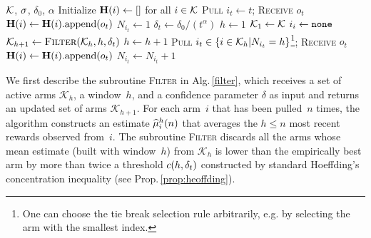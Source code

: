  \begin{minipage}{\textwidth}
\renewcommand*\footnoterule{}
\begin{savenotes}
\begin{algorithm}[H]
\caption{\myAlgorithm}
\label{alg:FEWA}
\begin{algorithmic}[1]
\Require $\mathcal{K}$,  $\sigma$, $\delta_0$, $\alpha$
\State Initialize $\mathbf{H}(i) \leftarrow []$ for all $i \in \mathcal{K}$
	\State \textsc{Pull}  $i_t \gets t$; \textsc{Receive} $o_{t}$
	\State $\mathbf{H}(i) \gets \mathbf{H}(i)\text{.append}(o_{t})$
	\State $N_{i_t} \gets 1$
\EndFor
{}
	\State $\delta_t \leftarrow \delta_0/(t^\alpha)$
	\State $h\leftarrow 1$ 
	{\footnotesize {}}
	\State $\mathcal{K}_1 \leftarrow \mathcal{K}$ 
	{\footnotesize {}}
	\State $i_i \gets {\tt none}$
		\State $\mathcal{K}_{h+1} \leftarrow {\textsc{Filter}}(\mathcal{K}_{h} ,h, \delta_t)$
		\State $h \leftarrow h + 1$ \label{algline:window}
			\label{algline:condition}
			\State \textsc{Pull}  $i_t \in \left\{ i \in \mathcal{K}_h | N_{i_t} = h \right\}$\footnote{One can choose the tie break selection rule arbitrarily, e.g. by selecting the arm with the smallest index.}; \textsc{Receive} $o_{t}$
		\EndIf
	\EndWhile
	\State $\mathbf{H}(i) \gets \mathbf{H}(i)\text{.append}(o_{t})$
	\State $N_{i_t} \leftarrow N_{i_t} +1$
\EndFor
\end{algorithmic}
\end{algorithm}
\end{savenotes}
\end{minipage}

We first describe the subroutine {\small\textsc{Filter}} in Alg.\,\ref{filter}, which receives a set of active arms $\mathcal{K}_h$, a window~$h$, and a confidence parameter $\delta$ as input and returns an updated set of arms $\mathcal{K}_{h+1}$. For each arm~$i$ that has been pulled~$n$ times, the algorithm constructs an estimate $\widehat{\mu}^h_i(n)$ that averages the $h \leq n$ most recent rewards observed from~$i$. %
The subroutine {\small\textsc{Filter}} discards all the arms whose mean estimate (built with window~$h$) from $\mathcal{K}_h$  is lower than the empirically best arm by more than twice a threshold $c(h, \delta_t)$ constructed by standard Hoeffding's concentration inequality (see Prop.\,\ref{prop:heoffding}). %




